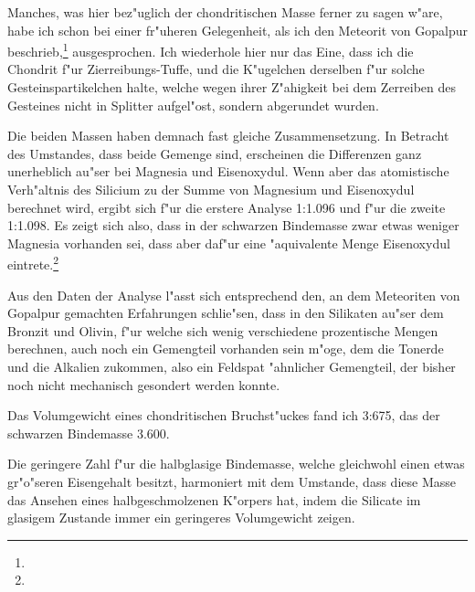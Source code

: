 \documentclass[a4paper, 11pt, oneside]{article}
\begin{document}
Manches, was hier bez"uglich der chondritischen Masse ferner zu sagen w"are, habe ich schon bei einer fr"uheren Gelegenheit, als ich den Meteorit von Gopalpur beschrieb,\footnote{} ausgesprochen. Ich wiederhole hier nur das Eine, dass ich die Chondrit f"ur Zierreibungs-Tuffe, und die K"ugelchen derselben f"ur solche Gesteinspartikelchen halte, welche wegen ihrer Z"ahigkeit bei dem Zerreiben des Gesteines nicht in Splitter aufgel"ost, sondern abgerundet wurden.

Die beiden Massen haben demnach fast gleiche Zusammensetzung. In Betracht des Umstandes, dass beide Gemenge sind, erscheinen die Differenzen ganz unerheblich au"ser bei Magnesia und Eisenoxydul. Wenn aber das atomistische Verh"altnis des Silicium zu der Summe von Magnesium und Eisenoxydul berechnet wird, ergibt sich f"ur die erstere Analyse 1:1.096 und f"ur die zweite 1:1.098. Es zeigt sich also, dass in der schwarzen Bindemasse zwar etwas weniger Magnesia vorhanden sei, dass aber daf"ur eine "aquivalente Menge Eisenoxydul eintrete.\footnote{}

Aus den Daten der Analyse l"asst sich entsprechend den, an dem Meteoriten von Gopalpur gemachten Erfahrungen schlie"sen, dass in den Silikaten au"ser dem Bronzit und Olivin, f"ur welche sich wenig verschiedene prozentische Mengen berechnen, auch noch ein Gemengteil vorhanden sein m"oge, dem die Tonerde und die Alkalien zukommen, also ein Feldspat "ahnlicher Gemengteil, der bisher noch nicht mechanisch gesondert werden konnte.

Das Volumgewicht eines chondritischen Bruchst"uckes fand ich 3:675, das der schwarzen Bindemasse 3.600.

Die geringere Zahl f"ur die halbglasige Bindemasse, welche gleichwohl einen etwas gr"o"seren Eisengehalt besitzt, harmoniert mit dem Umstande, dass diese Masse das Ansehen eines halbgeschmolzenen K"orpers hat, indem die Silicate im glasigem Zustande immer ein geringeres Volumgewicht zeigen.
\end{document}

